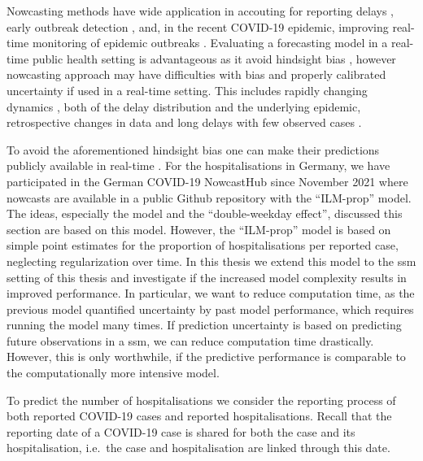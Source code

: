 Nowcasting methods have wide application in accouting for reporting delays \citep{Midthune2005Modeling}, early outbreak detection \citep{Salmon2015Bayesian,Bastos2019Modelling}, and, in the recent COVID-19 epidemic, improving real-time monitoring of epidemic outbreaks \citep{AnDerHeiden2020Schatzung,Gunther2021Nowcasting,Schneble2021Nowcasting,Akhmetzhanov2021Estimation}. Evaluating a forecasting model in a real-time public health setting is advantageous as it avoid hindsight bias \citep{Desai2019Realtime}, however nowcasting approach may have difficulties with bias and properly calibrated uncertainty if used in a real-time setting. This includes rapidly changing dynamics \citep{Gunther2021Nowcasting,vandeKassteele2019Nowcasting}, both of the delay distribution and the underlying epidemic, retrospective changes in data \citep{Midthune2005Modeling} and long delays with few observed cases \citep{Noufaily2015Modelling}. 

To avoid the aforementioned hindsight bias one can make their predictions publicly available in real-time \citep{Ray2020Ensemble,Bracher2021Preregistered}. For the hospitalisations in Germany, we have participated in the German COVID-19 NowcastHub \citep{2022Nowcasts} since November 2021 where nowcasts are available in a public Github repository \citep{2022Hospitalization} with the ``ILM-prop'' model. The ideas, especially the model and the ``double-weekday effect'', discussed this section are based on this model. However, the ``ILM-prop'' model is based on simple point estimates for the proportion of hospitalisations per reported case, neglecting regularization over time. In this thesis we extend this model to the \gls{ssm} setting of this thesis and investigate if the increased model complexity results in improved performance. In particular, we want to reduce computation time, as the previous model quantified uncertainty by past model performance, which requires running the model many times. If prediction uncertainty is based on predicting future observations in a \acrshort{ssm}, we can reduce computation time drastically. However, this is only worthwhile, if the predictive performance is comparable to the computationally more intensive model.

To predict the number of hospitalisations we consider the reporting process of both reported COVID-19 cases and reported hospitalisations. Recall that the reporting date of a COVID-19 case is shared for both the case and its hospitalisation, i.e.~the case and hospitalisation are linked through this date.

